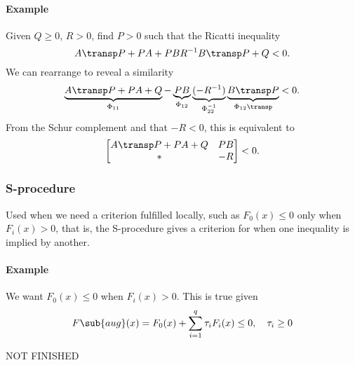 \paragraph{Example} Given $Q \geq 0$, $R > 0$, find $P > 0$ such that the Ricatti inequality
\begin{equation}
    A\transp P + PA + PBR^{-1}B\transp P + Q < 0.
\end{equation}
We can rearrange to reveal a similarity
\begin{equation}
    \underbrace{A\transp P + PA + Q}_{\Phi_{11}}
    -
    \underbrace{PB}_{\Phi_{12}}
    \underbrace{(-R^{-1})}_{\Phi_{22}^{-1}}
    \underbrace{B\transp P}_{\Phi_{12}\transp}
    < 0.
\end{equation}
From the Schur complement and that $-R < 0$, this is equivalent to
\begin{equation}
    \begin{bmatrix}
        A\transp P + PA + Q & PB \\
        * & -R
    \end{bmatrix}
    < 0.
\end{equation}

\subsubsection{S-procedure}
Used when we need a criterion fulfilled locally, such as $F_0(x) \leq 0$ only when $F_i(x) > 0$, that is, the S-procedure gives a criterion for when one inequality is implied by another.

\paragraph{Example} We want $F_0(x) \leq 0$ when $F_i(x) > 0$. This is true given
\begin{equation}
    F\sub{aug}(x) = F_0(x) + \sum_{i=1}^q \tau_i F_i(x) \leq 0, \quad \tau_i \geq 0
\end{equation}

NOT FINISHED
